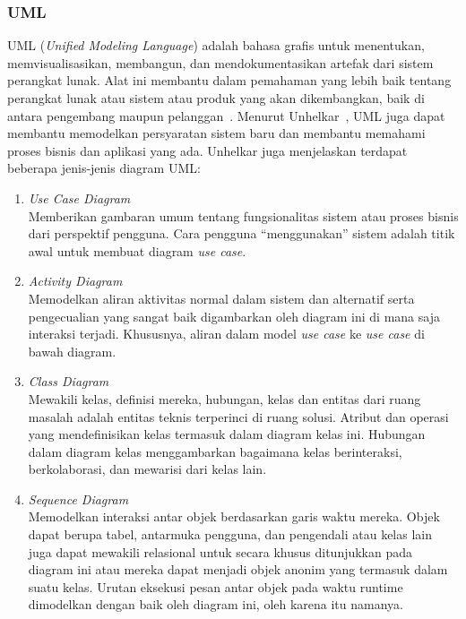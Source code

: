 \subsubsection{UML}
UML (\textit{Unified Modeling Language}) adalah bahasa grafis untuk menentukan, memvisualisasikan, membangun, dan mendokumentasikan artefak dari sistem perangkat lunak. Alat ini membantu dalam pemahaman yang lebih baik tentang perangkat lunak atau sistem atau produk yang akan dikembangkan, baik di antara pengembang maupun pelanggan~\cite{uml2022suriya}. Menurut Unhelkar~\cite{unhelkar2017software}, UML juga dapat membantu memodelkan persyaratan sistem baru dan membantu memahami proses bisnis dan aplikasi yang ada. Unhelkar juga menjelaskan terdapat beberapa jenis-jenis diagram UML:
\begin{enumerate}
    \item \textit{Use Case Diagram}
    \\ Memberikan gambaran umum tentang fungsionalitas sistem atau proses bisnis dari perspektif pengguna. Cara pengguna “menggunakan” sistem adalah titik awal untuk membuat diagram \textit{use case}.

    \item \textit{Activity Diagram}
    \\ Memodelkan aliran aktivitas normal dalam sistem dan alternatif serta pengecualian yang sangat baik digambarkan oleh diagram ini di mana saja interaksi terjadi. Khususnya, aliran dalam model \textit{use case} ke \textit{use case} di bawah diagram.

    \item \textit{Class Diagram}
    \\ Mewakili kelas, definisi mereka, hubungan, kelas dan entitas dari ruang masalah adalah entitas teknis terperinci di ruang solusi. Atribut dan operasi yang mendefinisikan kelas termasuk dalam diagram kelas ini. Hubungan dalam diagram kelas menggambarkan bagaimana kelas berinteraksi, berkolaborasi, dan mewarisi dari kelas lain.

    \item \textit{Sequence Diagram}
    \\ Memodelkan interaksi antar objek berdasarkan garis waktu mereka. Objek dapat berupa tabel, antarmuka pengguna, dan pengendali atau kelas lain juga dapat mewakili relasional untuk secara khusus ditunjukkan pada diagram ini atau mereka dapat menjadi objek anonim yang termasuk dalam suatu kelas. Urutan eksekusi pesan antar objek pada waktu runtime dimodelkan dengan baik oleh diagram ini, oleh karena itu namanya.
\end{enumerate}

